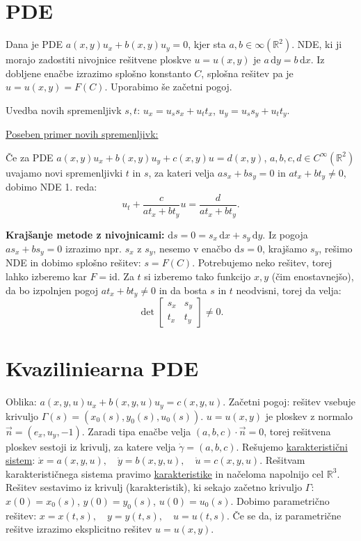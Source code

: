 \documentclass[8pt,a4paper]{amsart}
\theoremstyle{definition} %
\theoremstyle{plain} %
\newcommand{\dx}{\ensuremath{\,\mathrm{d}x}}
\newcommand{\dy}{\ensuremath{\,\mathrm{d}y}}
\newcommand{\R}{\mathbb R}
\begin{document}
\thispagestyle{empty}
\setlength{\parindent}{0pt}

\fontsize{7pt}{7pt}

\section*{PDE}

Dana je PDE $a(x,y)u_x + b(x,y)u_y = 0$, kjer sta $a,b \in {\infty}(\R^2)$. NDE,
ki ji morajo zadostiti nivojnice rešitvene ploskve $u = u(x,y)$ je $a\dy =
b\dx$. Iz dobljene enačbe izrazimo splošno konstanto $C$, splošna rešitev pa je
$u = u(x,y) = F(C)$. Uporabimo še začetni pogoj.

Uvedba novih spremenljivk $s,t$: $u_x = u_s s_x + u_t t_x$, $u_y = u_s s_y + u_t
t_y$.

\underline{Poseben primer novih spremenljivk:}

Če za PDE $a(x,y)u_x + b(x,y)u_y + c(x,y)u = d(x,y)$, $a,b,c,d \in
C^{\infty}(\R^2)$ uvajamo novi spremenljivki $t$ in $s$, za kateri velja $as_x +
bs_y = 0$ in $at_x + bt_y \neq 0$, dobimo NDE 1. reda: $$ u_t + \frac{c}{at_x +
bt_y}u = \frac{d}{at_x + bt_y}.  $$

\textbf{Krajšanje metode z nivojnicami:} $\text{d}s = 0 = s_x \dx + s_y \dy$. Iz
pogoja $as_x + bs_y = 0$ izrazimo npr. $s_x$ z $s_y$, nesemo v enačbo $\text{d}s
= 0$, krajšamo $s_y$, rešimo NDE in dobimo splošno rešitev: $s = F(C)$.
Potrebujemo neko rešitev, torej lahko izberemo kar $F = \text{id}$. Za $t$ si
izberemo tako funkcijo $x,y$ (čim enostavnejšo), da bo izpolnjen pogoj $at_x +
bt_y \neq 0$ in da bosta $s$ in $t$ neodvisni, torej da velja: $$ \det
\begin{bmatrix} s_x & s_y \\ t_x & t_y \end{bmatrix} \neq 0.  $$

\section*{Kvaziliniearna PDE}

Oblika: $a(x,y,u)u_x + b(x,y,u)u_y = c(x,y,u)$. Začetni pogoj: rešitev vsebuje
krivuljo $\Gamma (s) = (x_0(s),y_0(s),u_0(s))$. $u = u(x,y)$ je ploskev z
normalo $\vec{n} = (e_x,u_y,-1)$. Zaradi tipa enačbe velja $(a,b,c)\cdot \vec{n}
= 0$, torej rešitvena ploskev sestoji iz krivulj, za katere velja $\dot{\gamma}
= (a,b,c)$. Rešujemo \underline{karakteristični sistem}: $ \dot{x}
=a(x,y,u),\quad \dot{y} =b(x,y,u),\quad \dot{u} =c(x,y,u).  $ Rešitvam
karakterističnega sistema pravimo \underline{karakteristike} in načeloma
napolnijo cel $\R^3$. Rešitev sestavimo iz krivulj (karakteristik), ki sekajo
začetno krivuljo $\Gamma$: $x(0) = x_0(s)$, $y(0) = y_0(s)$, $u(0) = u_0(s)$.
Dobimo parametrično rešitev: $ x =x(t,s) ,\quad y =y(t,s) ,\quad u =u(t,s).  $
Če se da, iz parametrične rešitve izrazimo eksplicitno rešitev $u = u(x,y)$.
\end{document}
